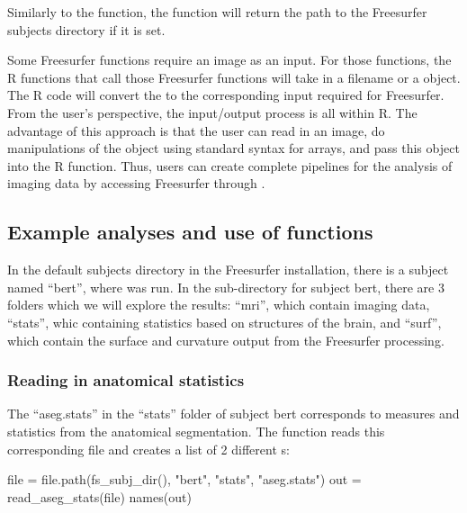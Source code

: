 Similarly to the  function, the 
function will return the path to the Freesurfer subjects directory if it
is set.

Some Freesurfer functions require an image as an input. For those
functions, the R  functions that call those Freesurfer
functions will take in a filename or a  object. The R code
will convert the  to the corresponding input required for
Freesurfer. From the user's perspective, the input/output process is all
within R. The advantage of this approach is that the user can read in an
image, do manipulations of the  object using standard syntax
for arrays, and pass this object into the  R function.
Thus, users can create complete pipelines for the analysis of imaging
data by accessing Freesurfer through .

\subsection{Example analyses and use of
functions}\label{example-analyses-and-use-of-functions}

In the default subjects directory in the Freesurfer installation, there
is a subject named ``bert'', where  was run. In the
sub-directory for subject bert, there are 3 folders which we will
explore the results: ``mri'', which contain imaging data, ``stats'',
whic containing statistics based on structures of the brain, and
``surf'', which contain the surface and curvature output from the
Freesurfer processing.

\subsubsection{Reading in anatomical
statistics}\label{reading-in-anatomical-statistics}

The ``aseg.stats'' in the ``stats'' folder of subject bert corresponds
to measures and statistics from the anatomical segmentation. The
 function reads this corresponding file and
creates a list of 2 different s:

\begin{Schunk}
\begin{Sinput}
file = file.path(fs_subj_dir(), "bert", "stats", "aseg.stats")
out = read_aseg_stats(file)
names(out)
\end{Sinput}
\end{Schunk}


